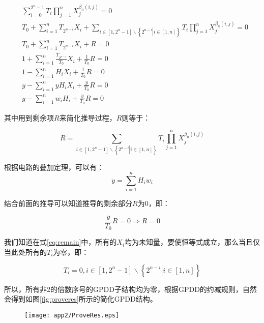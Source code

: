 \begin{align}
&\sum\limits_{i = 0}^{{2^n} - 1} {{T_i}\prod\limits_{j = 1}^n {X_j^{{\beta _n}\left( {i,j} \right)}} }  = 0\\
&{T_0} + \sum\limits_{i = 1}^n {{T_{{2^{n - i}}}}{X_i}}  + \sum\limits_{i \in \left[ {1,{2^n} - 1} \right]\backslash \left\{ {\left. {{2^{n - i}}} \right|i \in \left[ {1,n} \right]} \right\}} {{T_i}\prod\limits_{j = 1}^n {X_j^{{\beta _n}\left( {i,j} \right)}} }  = 0\\
&{T_0} + \sum\limits_{i = 1}^n {{T_{{2^{n - i}}}}{X_i}}  + R = 0\\
&1 + \sum\limits_{i = 1}^n {\frac{{{T_{{2^{n - i}}}}}}{{{T_0}}}{X_i}}  + \frac{1}{{{T_0}}}R = 0\\
&1 - \sum\limits_{i = 1}^n {{H_i}{X_i}}  + \frac{1}{{{T_0}}}R = 0\\
&y - \sum\limits_{i = 1}^n {y{H_i}{X_i}}  + \frac{y}{{{T_0}}}R = 0\\
&y - \sum\limits_{i = 1}^n {{w_i}{H_i}}  + \frac{y}{{{T_0}}}R = 0
\end{align}

其中用到剩余项$R$来简化推导过程，$R$则等于：

\begin{equation}\label{eq:remain}
R=\sum\limits_{i \in \left[ {1,{2^n} - 1} \right]\backslash \left\{ {\left. {{2^{n - i}}} \right|i \in \left[ {1,n} \right]} \right\}} {{T_i}\prod\limits_{j = 1}^n {X_j^{{\beta _n}\left( {i,j} \right)}} }
\end{equation}

根据电路的叠加定理，可以有：
\begin{equation}
y = \sum\limits_{i = 1}^n {{H_i}{w_i}}
\end{equation}

结合前面的推导可以知道推导的剩余部分$R$为0，即：

\begin{equation}
\frac{y}{{{T_0}}}R = 0 \Rightarrow R=0
\end{equation}

我们知道在式\ref{eq:remain}中，所有的$X_i$均为未知量，要使恒等式成立，那么当且仅当此处所有的$T_i$为零，即：

\begin{equation}
{T_i} = 0,i \in \left[ {1,{2^n} - 1} \right]\backslash \left\{ {\left. {{2^{n - i}}} \right|i \in \left[ {1,n} \right]} \right\}
\end{equation}

所以，所有非2的倍数序号的GPDD子结构均为零，根据GPDD的约减规则，自然会得到如图\ref{fig:proveres}所示的简化GPDD结构。

\begin{figure}[!htp]
	\centering
	\texttt{[image: app2/ProveRes.eps]}
\end{figure}